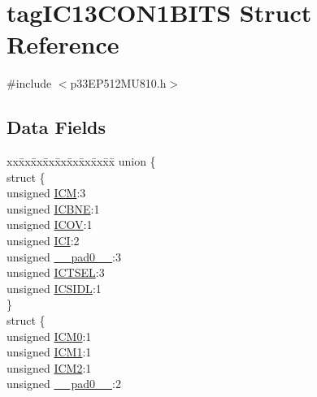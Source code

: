 \hypertarget{structtag_i_c13_c_o_n1_b_i_t_s}{}\section{tag\+I\+C13\+C\+O\+N1\+B\+I\+TS Struct Reference}
\label{structtag_i_c13_c_o_n1_b_i_t_s}


{\ttfamily \#include $<$p33\+E\+P512\+M\+U810.\+h$>$}

\subsection*{Data Fields}
\begin{DoxyCompactItemize}
\item 
\begin{tabbing}
xx\=xx\=xx\=xx\=xx\=xx\=xx\=xx\=xx\=\kill
union \{\\
\>struct \{\\
\>\>unsigned \hyperlink{structtag_i_c13_c_o_n1_b_i_t_s_ad3edde44ecb2d349ffa2decd0a251c20}{ICM}:3\\
\>\>unsigned \hyperlink{structtag_i_c13_c_o_n1_b_i_t_s_a824e7dcca83939e1b049d63ffcee33e9}{ICBNE}:1\\
\>\>unsigned \hyperlink{structtag_i_c13_c_o_n1_b_i_t_s_a49392949376ba0bf58cf8db889e86c94}{ICOV}:1\\
\>\>unsigned \hyperlink{structtag_i_c13_c_o_n1_b_i_t_s_a72486dcb868aad2d5c978494691356cc}{ICI}:2\\
\>\>unsigned \hyperlink{structtag_i_c13_c_o_n1_b_i_t_s_adf71f3d8410c1f1dbbc96680a92c49af}{\_\_pad0\_\_}:3\\
\>\>unsigned \hyperlink{structtag_i_c13_c_o_n1_b_i_t_s_a7a9dd41b5f93eb620df7fa336e452677}{ICTSEL}:3\\
\>\>unsigned \hyperlink{structtag_i_c13_c_o_n1_b_i_t_s_af441b36127c0bb7a35162dfc9a64103c}{ICSIDL}:1\\
\>\} \\
\>struct \{\\
\>\>unsigned \hyperlink{structtag_i_c13_c_o_n1_b_i_t_s_a649b1dd9bca75e558f37a9f52a829bd4}{ICM0}:1\\
\>\>unsigned \hyperlink{structtag_i_c13_c_o_n1_b_i_t_s_af3fe77ef9f8ca41ff11519f445e7bc77}{ICM1}:1\\
\>\>unsigned \hyperlink{structtag_i_c13_c_o_n1_b_i_t_s_a3c62c9cbbc3a406402126c932b709db8}{ICM2}:1\\
\>\>unsigned \hyperlink{structtag_i_c13_c_o_n1_b_i_t_s_adf71f3d8410c1f1dbbc96680a92c49af}{\_\_pad0\_\_}:2\\

\end{tabbing}
\end{DoxyCompactItemize}
